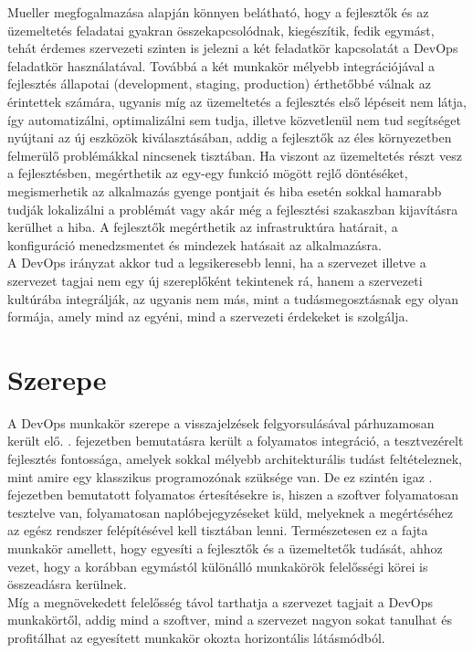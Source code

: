Mueller megfogalmazása alapján könnyen belátható, hogy a fejlesztők és az üzemeltetés feladatai gyakran összekapcsolódnak, kiegészítik, fedik egymást, tehát érdemes szervezeti szinten is jelezni a két feladatkör kapcsolatát a DevOps feladatkör használatával.
Továbbá a két munkakör mélyebb integrációjával a fejlesztés állapotai (development, staging, production) érthetőbbé válnak az érintettek számára, ugyanis míg az üzemeltetés a fejlesztés első lépéseit nem látja, így automatizálni, optimalizálni sem tudja, illetve közvetlenül nem tud segítséget nyújtani az új eszközök kiválasztásában, addig a fejlesztők az éles környezetben felmerülő problémákkal nincsenek tisztában. Ha viszont az üzemeltetés részt vesz a fejlesztésben, megérthetik az egy-egy funkció mögött rejlő döntéséket, megismerhetik az alkalmazás gyenge pontjait és hiba esetén sokkal hamarabb tudják lokalizálni a problémát vagy akár még a fejlesztési szakaszban kijavításra kerülhet a hiba. A fejlesztők megérthetik az infrastruktúra határait, a konfiguráció menedzsmentet és mindezek hatásait az alkalmazásra.\\
A DevOps irányzat akkor tud a legsikeresebb lenni, ha a szervezet illetve a szervezet tagjai nem egy új szereplőként tekintenek rá, hanem a szervezeti kultúrába integrálják, az ugyanis nem más, mint a tudásmegosztásnak egy olyan formája, amely mind az egyéni, mind a szervezeti érdekeket is szolgálja.

\section[A DevOps munkakör szerepe]{Szerepe}

A DevOps munkakör szerepe a visszajelzések felgyorsulásával párhuzamosan került elő. . fejezetben bemutatásra került a folyamatos integráció, a tesztvezérelt fejlesztés fontossága, amelyek sokkal mélyebb architekturális tudást feltételeznek, mint amire egy klasszikus programozónak szüksége van. De ez szintén igaz . fejezetben bemutatott folyamatos értesítésekre is, hiszen a szoftver folyamatosan tesztelve van, folyamatosan naplóbejegyzéseket küld, melyeknek a megértéséhez az egész rendszer felépítésével kell tisztában lenni. Természetesen ez a fajta munkakör amellett, hogy egyesíti a fejlesztők és a üzemeltetők tudását, ahhoz vezet, hogy a korábban egymástól különálló munkakörök felelősségi körei is összeadásra kerülnek.\\
Míg a megnövekedett felelősség távol tarthatja a szervezet tagjait a DevOps munkakörtől, addig mind a szoftver, mind a szervezet nagyon sokat tanulhat és profitálhat az egyesített munkakör okozta horizontális látásmódból.

